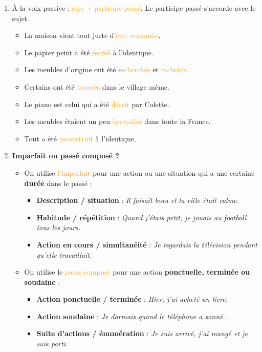 \documentclass[math,code]{amznotes}
\theoremstyle{remark}
\begin{document}
\begin{enumerate}
    \item À la voix passive : \textcolor{orange}{être + participe passé}. Le participe passé s'accorde avec le sujet.
    \begin{itemize}
        \item La maison vient tout juste d'\textcolor{orange}{être restaurée}.
        \item Le papier peint a été \textcolor{orange}{recréé} à l'identique.
        \item Les meubles d'origine ont été \textcolor{orange}{recherchés} et \textcolor{orange}{rachetés}.
        \item Certains ont été \textcolor{orange}{trouvés} dans le village même.
        \item Le piano est celui qui a été \textcolor{orange}{décrit} par Colette.
        \item Les meubles étaient un peu \textcolor{orange}{éparpillés} dans toute la France.
        \item Tout a été \textcolor{orange}{reconstruit} à l'identique.
    \end{itemize}

    \item \textbf{Imparfait ou passé composé ?}
    
    \begin{itemize}
        \item On utilise \textcolor{orange}{l'imparfait} pour une action ou une situation
        qui a une certaine \textbf{durée} dans le passé :
        \begin{itemize}
            \item \textbf{Description / situation} :
            \textit{Il faisait beau et la ville était calme.}
            \item \textbf{Habitude / répétition} :
            \textit{Quand j'étais petit, je jouais au football tous les jours.}
            \item \textbf{Action en cours / simultanéité} :
            \textit{Je regardais la télévision pendant qu'elle travaillait.}
        \end{itemize}
    
        \item On utilise le \textcolor{orange}{passé composé} pour une action
        \textbf{ponctuelle, terminée ou soudaine} :
        \begin{itemize}
            \item \textbf{Action ponctuelle / terminée} :
            \textit{Hier, j'ai acheté un livre.}
            \item \textbf{Action soudaine} :
            \textit{Je dormais quand le téléphone a sonné.}
            \item \textbf{Suite d'actions / énumération} :
            \textit{Je suis arrivé, j'ai mangé et je suis parti.}
        \end{itemize}
    \end{itemize}
    

\end{enumerate}
\end{document}

